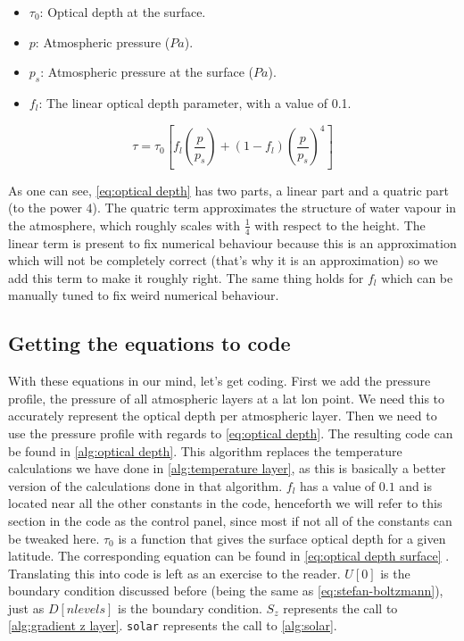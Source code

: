 \begin{itemize}
    \item $\tau_0$: Optical depth at the surface.
    \item $p$: Atmospheric pressure ($Pa$).
    \item $p_s$: Atmospheric pressure at the surface ($Pa$).
    \item $f_l$: The linear optical depth parameter, with a value of 0.1.
\end{itemize}

\begin{equation}
    \tau = \tau_0[f_l(\frac{p}{p_s}) + (1 - f_l)(\frac{p}{p_s})^4]
    \label{eq:optical depth}
\end{equation}

As one can see, \autoref{eq:optical depth} has two parts, a linear part and a quatric part (to the power $4$). The quatric term approximates the structure of water vapour in the atmosphere, which 
roughly scales with $\frac{1}{4}$ with respect to the height. The linear term is present to fix numerical behaviour because this is an approximation which will not be completely correct (that's
why it is an approximation) so we add this term to make it roughly right. The same thing holds for $f_l$ which can be manually tuned to fix weird numerical behaviour.


\subsection{Getting the equations to code}
With these equations in our mind, let's get coding. First we add the pressure profile, the pressure of all atmospheric layers at a lat lon point. We need this to accurately represent the optical 
depth per atmospheric layer. Then we need to use the pressure profile with regards to \autoref{eq:optical depth}. The resulting code can be found in \autoref{alg:optical depth}. This algorithm 
replaces the temperature calculations we have done in \autoref{alg:temperature layer}, as this is basically a better version of the calculations done in that algorithm. $f_l$ has a value of $0.1$
and is located near all the other constants in the code, henceforth we will refer to this section in the code as the control panel, since most if not all of the constants can be tweaked here. 
$\tau_0$ is a function that gives the surface optical depth for a given latitude. The corresponding equation can be found in \autoref{eq:optical depth surface} \cite{simon}. Translating this 
into code is left as an exercise to the reader. $U[0]$ is the boundary condition discussed before (being the same as \autoref{eq:stefan-boltzmann}), just as $D[nlevels]$ is the boundary condition. 
$S_z$ represents the call to \autoref{alg:gradient z layer}. \texttt{solar} represents the call to \autoref{alg:solar}.

